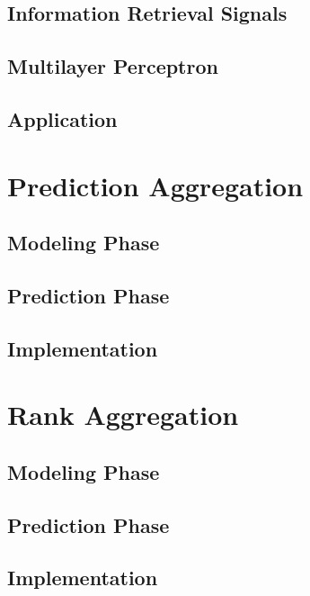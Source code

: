 \subsection{Information Retrieval Signals}

\subsection{Multilayer Perceptron}

\subsection{Application}



\section{Prediction Aggregation}

\subsection{Modeling Phase}

\subsection{Prediction Phase}

\subsection{Implementation}



\section{Rank Aggregation}

\subsection{Modeling Phase}

\subsection{Prediction Phase}

\subsection{Implementation}



